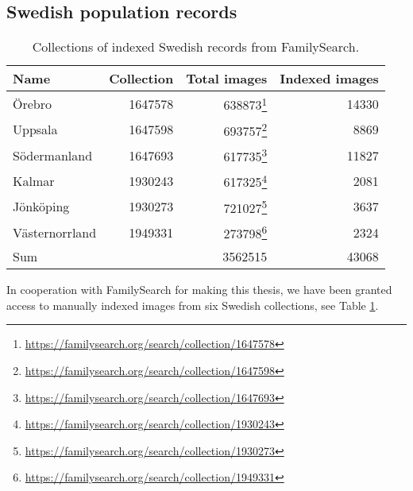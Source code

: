 \subsection{Swedish population records}

\begin{table}
\centering
\begin{tabular}{ l | r r r}
Name & Collection & Total images & Indexed images \\
\hline
Örebro	& 1647578	& 638873\footnote{\url{https://familysearch.org/search/collection/1647578}}	& 14330 \\
Uppsala	& 1647598	& 693757\footnote{\url{https://familysearch.org/search/collection/1647598}}	& 8869 \\
Södermanland	& 1647693	& 617735\footnote{\url{https://familysearch.org/search/collection/1647693}}	& 11827 \\
Kalmar	& 1930243	& 617325\footnote{\url{https://familysearch.org/search/collection/1930243}}	& 2081 \\
Jönköping	& 1930273	& 721027\footnote{\url{https://familysearch.org/search/collection/1930273}}	& 3637 \\
Västernorrland	& 1949331	& 273798\footnote{\url{https://familysearch.org/search/collection/1949331}}	& 2324 \\
\hline
Sum & & 3562515 & 43068
\end{tabular}
\caption{Collections of indexed Swedish records from FamilySearch.}
\label{tab:collections}
\end{table}

In cooperation with FamilySearch for making this thesis, we have been granted access to manually indexed images from six Swedish collections, see Table \ref{tab:collections}.